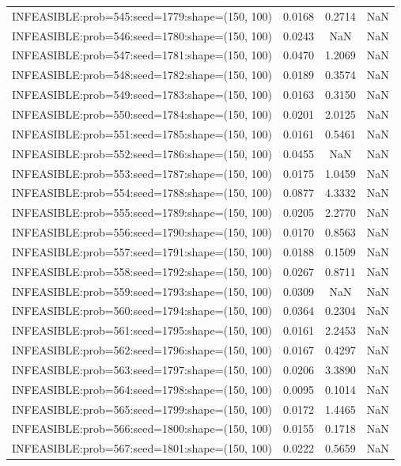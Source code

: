 \begin{longtable}{lccc}
INFEASIBLE:prob=545:seed=1779:shape=(150, 100) & 0.0168 &  0.2714 &    NaN \\
INFEASIBLE:prob=546:seed=1780:shape=(150, 100) & 0.0243 &     NaN &    NaN \\
INFEASIBLE:prob=547:seed=1781:shape=(150, 100) & 0.0470 &  1.2069 &    NaN \\
INFEASIBLE:prob=548:seed=1782:shape=(150, 100) & 0.0189 &  0.3574 &    NaN \\
INFEASIBLE:prob=549:seed=1783:shape=(150, 100) & 0.0163 &  0.3150 &    NaN \\
INFEASIBLE:prob=550:seed=1784:shape=(150, 100) & 0.0201 &  2.0125 &    NaN \\
INFEASIBLE:prob=551:seed=1785:shape=(150, 100) & 0.0161 &  0.5461 &    NaN \\
INFEASIBLE:prob=552:seed=1786:shape=(150, 100) & 0.0455 &     NaN &    NaN \\
INFEASIBLE:prob=553:seed=1787:shape=(150, 100) & 0.0175 &  1.0459 &    NaN \\
INFEASIBLE:prob=554:seed=1788:shape=(150, 100) & 0.0877 &  4.3332 &    NaN \\
INFEASIBLE:prob=555:seed=1789:shape=(150, 100) & 0.0205 &  2.2770 &    NaN \\
INFEASIBLE:prob=556:seed=1790:shape=(150, 100) & 0.0170 &  0.8563 &    NaN \\
INFEASIBLE:prob=557:seed=1791:shape=(150, 100) & 0.0188 &  0.1509 &    NaN \\
INFEASIBLE:prob=558:seed=1792:shape=(150, 100) & 0.0267 &  0.8711 &    NaN \\
INFEASIBLE:prob=559:seed=1793:shape=(150, 100) & 0.0309 &     NaN &    NaN \\
INFEASIBLE:prob=560:seed=1794:shape=(150, 100) & 0.0364 &  0.2304 &    NaN \\
INFEASIBLE:prob=561:seed=1795:shape=(150, 100) & 0.0161 &  2.2453 &    NaN \\
INFEASIBLE:prob=562:seed=1796:shape=(150, 100) & 0.0167 &  0.4297 &    NaN \\
INFEASIBLE:prob=563:seed=1797:shape=(150, 100) & 0.0206 &  3.3890 &    NaN \\
INFEASIBLE:prob=564:seed=1798:shape=(150, 100) & 0.0095 &  0.1014 &    NaN \\
INFEASIBLE:prob=565:seed=1799:shape=(150, 100) & 0.0172 &  1.4465 &    NaN \\
INFEASIBLE:prob=566:seed=1800:shape=(150, 100) & 0.0155 &  0.1718 &    NaN \\
INFEASIBLE:prob=567:seed=1801:shape=(150, 100) & 0.0222 &  0.5659 &    NaN \\

\end{longtable}
